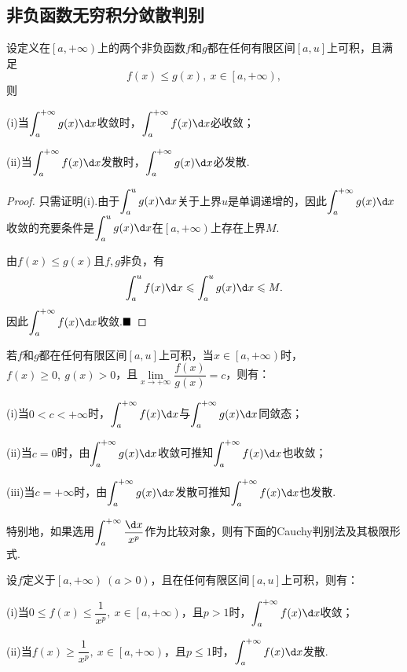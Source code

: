 \subsection{非负函数无穷积分敛散判别}
\begin{theorem}[比较原则]
	设定义在$\left[a,+\infty\right)$上的两个非负函数$f$和$g$都在任何有限区间$\left[a,u\right]$上可积，且满足
	$$f(x)\leqslant g(x),\ x\in \left[a,+\infty\right),$$
	则

		(i)当$\displaystyle\int_{a}^{+\infty}g(x)\d x$收敛时，$\displaystyle\int_{a}^{+\infty}f(x)\d x$必收敛；
		
		(ii)当$\displaystyle\int_{a}^{+\infty}f(x)\d x$发散时，$\displaystyle\int_{a}^{+\infty}g(x)\d x$必发散.

	
\end{theorem}
\begin{proof}
	只需证明(i).由于$\displaystyle\int_{a}^{u}g(x)\d x$关于上界$u$是单调递增的，因此$\displaystyle\int_{a}^{+\infty}g(x)\d x$收敛的充要条件是$\displaystyle\int_{a}^{u}g(x)\d x$在$\left[a,+\infty\right)$上存在上界$M$.
	
	由$f(x)\leqslant g(x)$且$f,g$非负，有
	$$\int_{a}^{u}f(x)\d x\leqslant\int_{a}^{u}g(x)\d x\leqslant M.$$
	因此$\displaystyle\int_{a}^{+\infty}f(x)\d x$收敛.$\hfill\blacksquare$
\end{proof}
\begin{corollary}[比较原则的极限形式]
	若$f$和$g$都在任何有限区间$\left[a,u\right]$上可积，当$x\in\left[a,+\infty\right)$时，$f(x)\geqslant 0,\ g(x)>0$，且$\lim\limits_{x\to +\infty}\dfrac{f(x)}{g(x)}=c$，则有：
	
	(i)当$0<c<+\infty$时，$\displaystyle\int_{a}^{+\infty}f(x)\d x$与$\displaystyle\int_{a}^{+\infty}g(x)\d x$同敛态；
	
	(ii)当$c=0$时，由$\displaystyle\int_{a}^{+\infty}g(x)\d x$收敛可推知$\displaystyle\int_{a}^{+\infty}f(x)\d x$也收敛；
	
	(iii)当$c=+\infty$时，由$\displaystyle\int_{a}^{+\infty}g(x)\d x$发散可推知$\displaystyle\int_{a}^{+\infty}f(x)\d x$也发散.
\end{corollary}
特别地，如果选用$\displaystyle\int_{a}^{+\infty}\frac{\d x}{x^p}$作为比较对象，则有下面的{\heiti Cauchy判别法}及其极限形式.
\begin{corollary}[Cauchy判别法]
	设$f$定义于$\left[a,+\infty\right)\ (a>0)$，且在任何有限区间$\left[a,u\right]$上可积，则有：
	
	(i)当$0\leqslant f(x)\leqslant\dfrac{1}{x^p},\ x\in\left[a,+\infty\right)$，且$p>1$时，$\displaystyle\int_{a}^{+\infty}f(x)\d x$收敛；
	
	(ii)当$f(x)\geqslant\dfrac{1}{x^p},\ x\in\left[a,+\infty\right)$，且$p\leqslant 1$时，$\displaystyle\int_{a}^{+\infty}f(x)\d x$发散.
\end{corollary}
